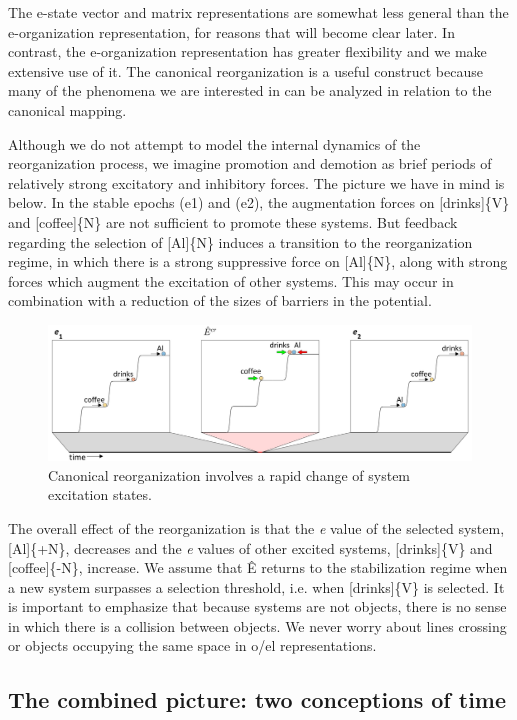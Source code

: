   The e-state vector and matrix representations are somewhat less general than the e-organization representation, for reasons that will become clear later. In contrast, the e-organization representation has greater flexibility and we make extensive use of it. The canonical reorganization is a useful construct because many of the phenomena we are interested in can be analyzed in relation to the canonical mapping.

  Although we do not attempt to model the internal dynamics of the reorganization process, we imagine promotion and demotion as brief periods of relatively strong excitatory and inhibitory forces. The picture we have in mind is below. In the stable epochs (e1) and (e2), the augmentation forces on [drinks]\{V\} and [coffee]\{N\} are not sufficient to promote these systems. But feedback regarding the selection of [Al]\{N\} induces a transition to the reorganization regime, in which there is a strong suppressive force on [Al]\{N\}, along with strong forces which augment the excitation of other systems. This may occur in combination with a reduction of the sizes of barriers in the potential. 

  
\begin{figure}
\includegraphics[width=\textwidth]{figures/Tilsen-img26.png}
\caption{Canonical reorganization involves a rapid change of system excitation states.}
\label{fig:2:19}
\end{figure}
 

  The overall effect of the reorganization is that the \textit{e} value of the selected system, [Al]\{+N\}, decreases and the \textit{e} values of other excited systems, [drinks]\{V\} and [coffee]\{-N\}, increase. We assume that Ê returns to the stabilization regime when a new system surpasses a selection threshold, i.e. when [drinks]\{V\} is selected. It is important to emphasize that because systems are not objects, there is no sense in which there is a collision between objects. We never worry about lines crossing or objects occupying the same space in o/el representations.

\subsection{The combined picture: two conceptions of time}

